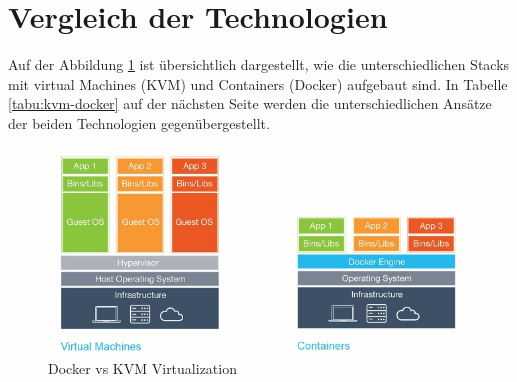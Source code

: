 \section{Vergleich der Technologien}

Auf der Abbildung \ref{fig:dockervirtualization} ist übersichtlich dargestellt, wie die unterschiedlichen Stacks mit virtual Machines (KVM) und Containers (Docker) aufgebaut sind. In Tabelle \ref{tabu:kvm-docker} auf der nächsten Seite werden die unterschiedlichen Ansätze der beiden Technologien gegenübergestellt.

\begin{figure}[h]
\centering
\includegraphics[width=0.7\linewidth]{images/docker_virtualization}
\caption{Docker vs KVM Virtualization}
\label{fig:dockervirtualization}
\end{figure}

